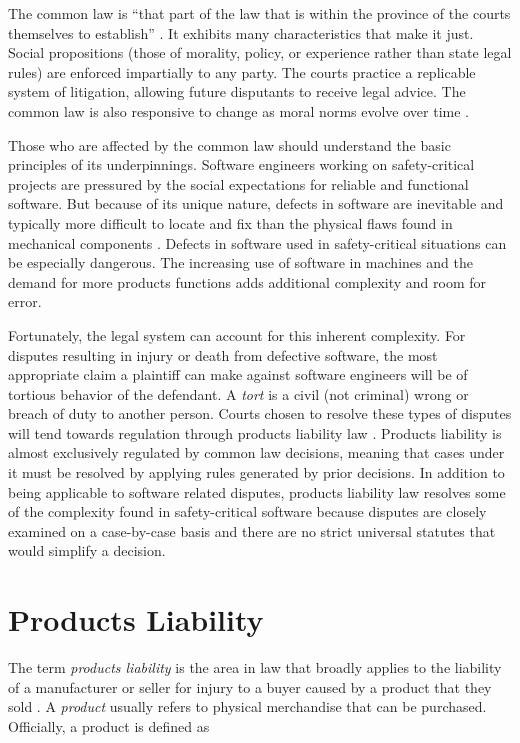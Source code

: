 \documentclass[12pt]{report}
\begin{document}
The common law is ``that part of the law that is within the province of the courts themselves to establish'' \cite{FAKE}. It exhibits many characteristics that make it just. Social propositions (those of morality, policy, or experience rather than state legal rules) are enforced impartially to any party. The courts practice a replicable system of litigation, allowing future disputants to receive legal advice. The common law is also responsive to change as moral norms evolve over time \cite{FAKE}. 

Those who are affected by the common law should understand the basic principles of its underpinnings. Software engineers working on safety-critical projects are pressured by the social expectations for reliable and functional software. But because of its unique nature, defects in software are inevitable and typically more difficult to locate and fix than the physical flaws found in mechanical components \cite{Parnas90}. Defects in software used in safety-critical situations can be especially dangerous. The increasing use of software in machines and the demand for more products functions adds additional complexity and room for error.

Fortunately, the legal system can account for this inherent complexity. For disputes resulting in injury or death from defective software, the most appropriate claim a plaintiff can make against software engineers will be of tortious behavior of the defendant. A \textit{tort} is a civil (not criminal) wrong or breach of duty to another person. Courts chosen to resolve these types of disputes will tend towards regulation through products liability law \cite{FAKE}. Products liability is almost exclusively regulated by common law decisions, meaning that cases under it must be resolved by applying rules generated by prior decisions. In addition to being applicable to software related disputes, products liability law resolves some of the complexity found in safety-critical software because disputes are closely examined on a case-by-case basis and there are no strict universal statutes that would simplify a decision.

\section{Products Liability} 
The term \textit{products liability} is the area in law that broadly applies to the liability of a manufacturer or seller for injury to a buyer caused by a product that they sold \cite{FAKE}. A \textit{product} usually refers to physical merchandise that can be purchased. Officially, a product is defined as 
\end{document}
